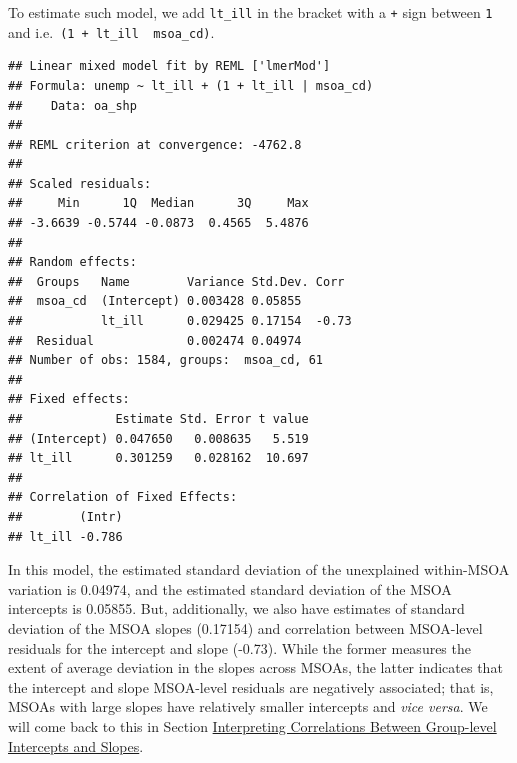 \documentclass[
]{book}
\newenvironment{Shaded}{\begin{snugshade}}{\end{snugshade}}
\newcommand{\AttributeTok}[1]{\textcolor[rgb]{0.77,0.63,0.00}{#1}}
\newcommand{\CommentTok}[1]{\textcolor[rgb]{0.56,0.35,0.01}{\textit{#1}}}
\newcommand{\DecValTok}[1]{\textcolor[rgb]{0.00,0.00,0.81}{#1}}
\newcommand{\FunctionTok}[1]{\textcolor[rgb]{0.00,0.00,0.00}{#1}}
\newcommand{\NormalTok}[1]{#1}
\newcommand{\OtherTok}[1]{\textcolor[rgb]{0.56,0.35,0.01}{#1}}
\newcommand{\SpecialCharTok}[1]{\textcolor[rgb]{0.00,0.00,0.00}{#1}}
\begin{document}
To estimate such model, we add \texttt{lt\_ill} in the bracket with a \texttt{+} sign between \texttt{1} and \texttt{\textbar{}} i.e.~\texttt{(1\ +\ lt\_ill\ \textbar{}\ msoa\_cd)}.

\begin{Shaded}
\end{Shaded}

\begin{verbatim}
## Linear mixed model fit by REML ['lmerMod']
## Formula: unemp ~ lt_ill + (1 + lt_ill | msoa_cd)
##    Data: oa_shp
## 
## REML criterion at convergence: -4762.8
## 
## Scaled residuals: 
##     Min      1Q  Median      3Q     Max 
## -3.6639 -0.5744 -0.0873  0.4565  5.4876 
## 
## Random effects:
##  Groups   Name        Variance Std.Dev. Corr 
##  msoa_cd  (Intercept) 0.003428 0.05855       
##           lt_ill      0.029425 0.17154  -0.73
##  Residual             0.002474 0.04974       
## Number of obs: 1584, groups:  msoa_cd, 61
## 
## Fixed effects:
##             Estimate Std. Error t value
## (Intercept) 0.047650   0.008635   5.519
## lt_ill      0.301259   0.028162  10.697
## 
## Correlation of Fixed Effects:
##        (Intr)
## lt_ill -0.786
\end{verbatim}

In this model, the estimated standard deviation of the unexplained within-MSOA variation is 0.04974, and the estimated standard deviation of the MSOA intercepts is 0.05855. But, additionally, we also have estimates of standard deviation of the MSOA slopes (0.17154) and correlation between MSOA-level residuals for the intercept and slope (-0.73). While the former measures the extent of average deviation in the slopes across MSOAs, the latter indicates that the intercept and slope MSOA-level residuals are negatively associated; that is, MSOAs with large slopes have relatively smaller intercepts and \emph{vice versa}. We will come back to this in Section \protect\hyperlink{interpreting-correlations-between-group-level-intercepts-and-slopes}{Interpreting Correlations Between Group-level Intercepts and Slopes}.
\end{document}
